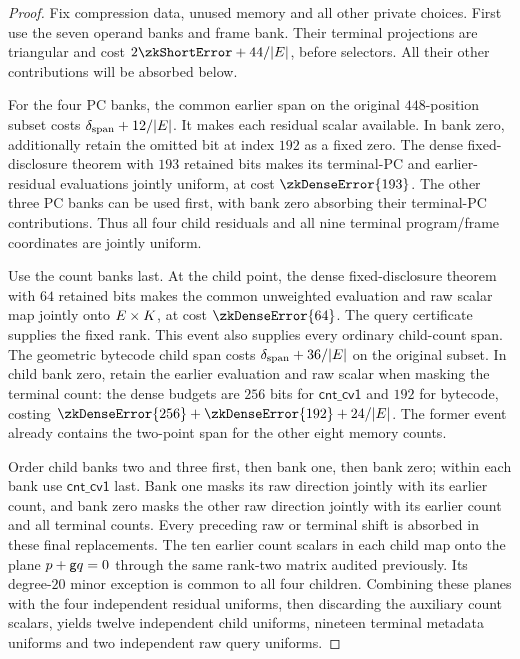 \begin{proof}
Fix compression data, unused memory and all other private choices. First use the seven operand banks and frame bank. Their terminal projections are triangular and cost $2\zkShortError+44/|\E|$, before selectors. All their other contributions will be absorbed below.

For the four PC banks, the common earlier span on the original $448$-position subset costs $\delta_{\mathrm{span}}+12/|E|$. It makes each residual scalar available. In bank zero, additionally retain the omitted bit at index $192$ as a fixed zero. The dense fixed-disclosure theorem with $193$ retained bits makes its terminal-PC and earlier-residual evaluations jointly uniform, at cost $\zkDenseError{193}$. The other three PC banks can be used first, with bank zero absorbing their terminal-PC contributions. Thus all four child residuals and all nine terminal program/frame coordinates are jointly uniform.

Use the count banks last. At the child point, the dense fixed-disclosure theorem with $64$ retained bits makes the common unweighted evaluation and raw scalar map jointly onto $E\times K$, at cost $\zkDenseError{64}$. The query certificate supplies the fixed rank. This event also supplies every ordinary child-count span. The geometric bytecode child span costs $\delta_{\mathrm{span}}+36/|E|$ on the original subset. In child bank zero, retain the earlier evaluation and raw scalar when masking the terminal count: the dense budgets are $256$ bits for $\mathsf{cnt\_cv1}$ and $192$ for bytecode, costing $\zkDenseError{256}+\zkDenseError{192}+24/|\E|$. The former event already contains the two-point span for the other eight memory counts.

Order child banks two and three first, then bank one, then bank zero; within each bank use $\mathsf{cnt\_cv1}$ last. Bank one masks its raw direction jointly with its earlier count, and bank zero masks the other raw direction jointly with its earlier count and all terminal counts. Every preceding raw or terminal shift is absorbed in these final replacements. The ten earlier count scalars in each child map onto the plane $p+\mathsf{g} q=0$ through the same rank-two matrix audited previously. Its degree-$20$ minor exception is common to all four children. Combining these planes with the four independent residual uniforms, then discarding the auxiliary count scalars, yields twelve independent child uniforms, nineteen terminal metadata uniforms and two independent raw query uniforms.


\end{proof}
